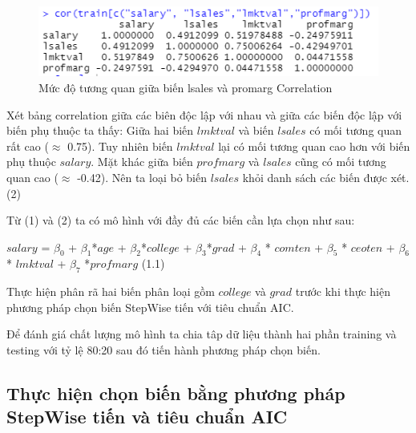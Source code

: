 \documentclass[a4paper]{article}
\begin{document}
\begin{figure}[h!]
	\centering
	\includegraphics[scale = 0.6]{../Photo Of Result/B1_CorTable.PNG}  
	\caption{Mức độ tương quan giữa biến lsales và promarg Correlation}
	\label{ex1:model:1}
\end{figure}

Xét bảng correlation giữa các biên độc lập với nhau và giữa các biến độc lập với biến phụ thuộc ta thấy: Giữa hai biến $\textit{lmktval}$ và biến $\textit{lsales}$ có mối tương quan rất cao ($\approx$ 0.75). Tuy nhiên biến $\textit{lmktval}$ lại có mối tương quan cao hơn với biến phụ thuộc $\textit{salary}$. Mặt khác giữa biến $\textit{profmarg}$ và $\textit{lsales}$ cũng có mối tương quan cao ($\approx$ -0.42). Nên ta loại bỏ biến $\textit{lsales}$ khỏi danh sách các biến được xét. (2)

Từ (1) và (2) ta có mô hình với đầy đủ các biến cần lựa chọn như sau:

$\textit{salary}$ = $\beta_0$ + $\beta_1$*$\textit{age}$ + $\beta_2$*$\textit{college}$ + $\beta_3$*$\textit{grad}$ + $\beta_4$ * $\textit{comten}$ + $\beta_5$ * $\textit{ceoten}$ + $\beta_6$ * $\textit{lmktval}$ + $\beta_7$ *$\textit{profmarg}$ (1.1)


Thực hiện phân rã hai biến phân loại gồm $\textit{college}$ và $\textit{grad}$ trước khi thực hiện phương pháp chọn biến StepWise tiến với tiêu chuẩn AIC.

Để đánh giá chất lượng mô hình ta chia tâp dữ liệu thành hai phần training và testing với tỷ lệ 80:20 sau đó tiến hành phương pháp chọn biến.

\subsection*{Thực hiện chọn biến bằng phương pháp StepWise tiến và tiêu chuẩn AIC}
\end{document}
